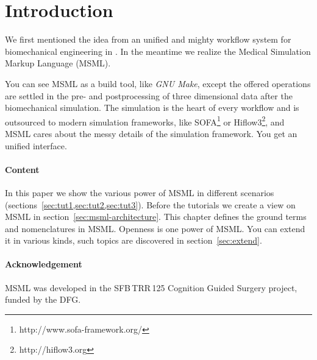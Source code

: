 \section{Introduction}
\label{sec:introduction}

We first mentioned the idea from an
unified and mighty workflow system for biomechanical engineering  in
\cite{Suwelack:2014}. In the meantime we realize the Medical
Simulation Markup Language (MSML).

You can see MSML as a build tool, like \emph{GNU Make}, except the
offered operations are settled in the pre- and postprocessing of
three dimensional data after the biomechanical simulation.
The simulation is the heart of every workflow and is outsourced to
modern simulation frameworks, like
SOFA\footnote{http://www.sofa-framework.org/} or
Hiflow3\footnote{http://hiflow3.org}, and MSML cares about the messy
details of the simulation framework. You get an unified interface.

\paragraph{Content}
\label{sec:content}

In this paper we show the various power of MSML in different
scenarios (sections~\ref{sec:tut1,sec:tut2,sec:tut3}).
Before the tutorials we create a view on MSML in
section~\ref{sec:msml-architecture}. This chapter defines the ground
terms and nomenclatures in MSML. Openness is one power of MSML. You
can extend it in various kinds, such topics are discovered in
section~\ref{sec:extend}.

\paragraph*{Acknowledgement}
\label{sec:acknowledgement}

MSML was developed in the SFB\,TRR\,125 Cognition Guided Surgery
project, funded by the DFG.


